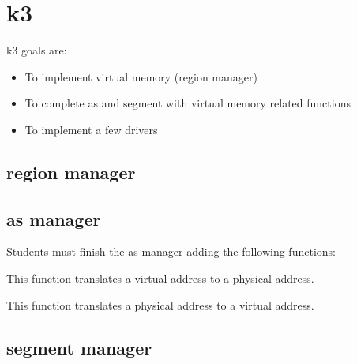 
\section{k3}

k3 goals are:

\begin{itemize}

\item To implement virtual memory (region manager)

\item To complete as and segment with virtual memory related functions

\item To implement a few drivers

\end{itemize}

\subsection{region manager}

\subsection{as manager}

Students must finish the as manager adding the following functions:


This function translates a virtual address to a physical address.


This function translates a physical address to a virtual address.

\subsection{segment manager}


